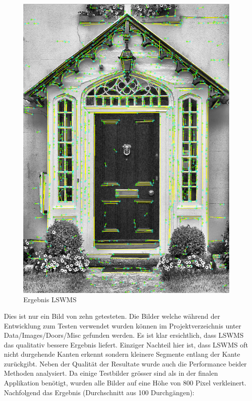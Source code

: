 \begin{figure}[!ht]
\centering
\includegraphics[scale=0.6]{images/lswms-raw-segments} 
\caption{Ergebnis LSWMS}
\label{fig:hough-raw-segments}
\end{figure}

\pagebreak

Dies ist nur ein Bild von zehn getesteten. Die Bilder welche während der Entwicklung zum Testen verwendet wurden können im Projektverzeichnis unter Data/Images/Doors/Misc gefunden werden. Es ist klar ersichtlich, dass LSWMS das qualitativ bessere Ergebnis liefert. Einziger Nachteil hier ist, dass LSWMS oft nicht durgehende Kanten erkennt sondern kleinere Segmente entlang der Kante zurückgibt. Neben der Qualität der Resultate wurde auch die Performance beider Methoden analysiert. Da einige Testbilder grösser sind als in der finalen Applikation benötigt, wurden alle Bilder auf eine Höhe von 800 Pixel verkleinert. Nachfolgend das Ergebnis (Durchschnitt aus 100 Durchgängen):

